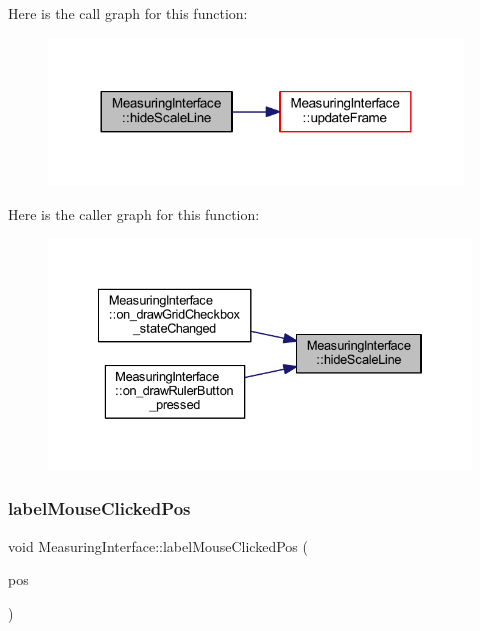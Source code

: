Here is the call graph for this function\+:
\nopagebreak
\begin{figure}[H]
\begin{center}
\leavevmode
\includegraphics[width=312pt]{classMeasuringInterface_ad6344a968dacd55de9a7509698442d67_cgraph}
\end{center}
\end{figure}
Here is the caller graph for this function\+:
\nopagebreak
\begin{figure}[H]
\begin{center}
\leavevmode
\includegraphics[width=334pt]{classMeasuringInterface_ad6344a968dacd55de9a7509698442d67_icgraph}
\end{center}
\end{figure}
\mbox{\label{classMeasuringInterface_a02eaf8106ec4eb62d0057c6d447f94c5}} 
\subsubsection{\texorpdfstring{labelMouseClickedPos}{labelMouseClickedPos}}
{\footnotesize\ttfamily void Measuring\+Interface\+::label\+Mouse\+Clicked\+Pos (\begin{DoxyParamCaption}\item[{Q\+Point \&}]{pos }\end{DoxyParamCaption})\hspace{0.3cm}{\ttfamily [slot]}}



